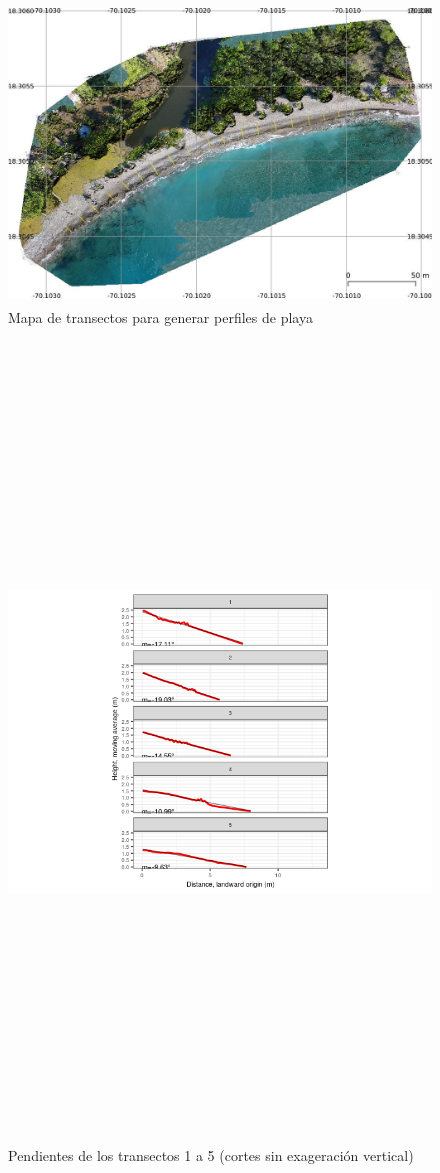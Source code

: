 \documentclass[11pt,]{article}
\begin{document}
\begin{figure}
\centering
\includegraphics[height=3.12500in]{transects-qgis.jpg}
\caption{Mapa de transectos para generar perfiles de
playa\label{transectos-mapa}}
\end{figure}

\begin{figure}
\centering
\includegraphics[height=8.33333in]{panels-1.png}
\caption{Pendientes de los transectos 1 a 5 (cortes sin exageración
vertical) \label{transectos-perfil1}}
\end{figure}
\end{document}
